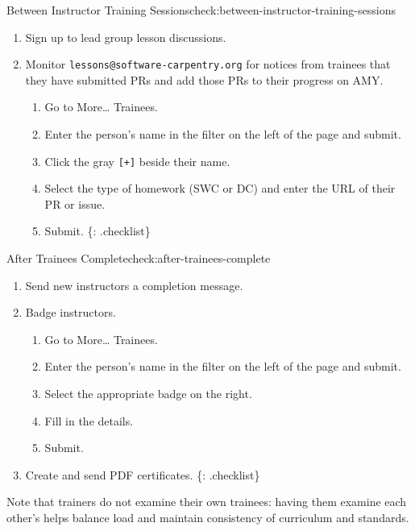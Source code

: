 \begin{checklist}{Between Instructor Training Sessions}{check:between-instructor-training-sessions}

\begin{enumerate}
\item
  Sign up to lead group lesson discussions.
\item
  Monitor \texttt{lessons@software-carpentry.org} for notices from
  trainees that they have submitted PRs and add those PRs to their
  progress on AMY.

  \begin{enumerate}
    \item
    Go to More\ldots{} Trainees.
  \item
    Enter the person's name in the filter on the left of the page and
    submit.
  \item
    Click the gray \texttt{{[}+{]}} beside their name.
  \item
    Select the type of homework (SWC or DC) and enter the URL of their
    PR or issue.
  \item
    Submit. \{: .checklist\}
  \end{enumerate}
\end{enumerate}
\end{checklist}

\begin{checklist}{After Trainees Complete}{check:after-trainees-complete}

\begin{enumerate}
\item
  Send new instructors
  a completion message.
\item
  Badge instructors.

  \begin{enumerate}
    \item
    Go to More\ldots{} Trainees.
  \item
    Enter the person's name in the filter on the left of the page and
    submit.
  \item
    Select the appropriate badge on the right.
  \item
    Fill in the details.
  \item
    Submit.
  \end{enumerate}
\item
  Create and send PDF certificates. \{: .checklist\}
\end{enumerate}
\end{checklist}

Note that trainers do not examine their own trainees: having them
examine each other's helps balance load and maintain consistency of
curriculum and standards.

